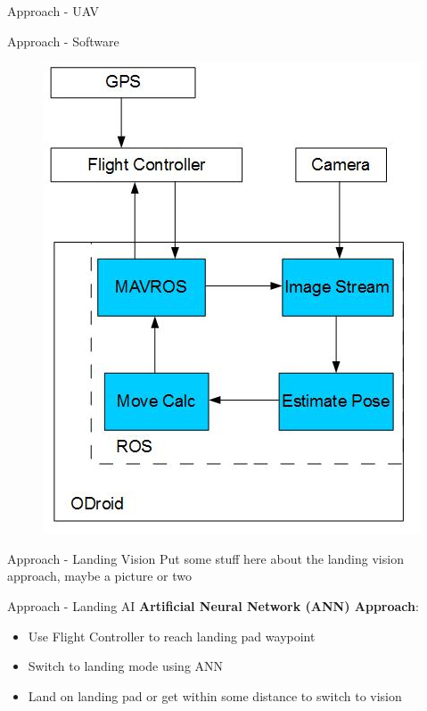 \documentclass[11pt]{beamer}
\begin{document}
\begin{frame}{Approach - UAV}

\end{frame}

\begin{frame}{Approach - Software}
\begin{figure}
\includegraphics[width=.5\textwidth]{broad_approach1}
\end{figure}
\end{frame}

\begin{frame}{Approach - Landing Vision}
Put some stuff here about the landing vision approach, maybe a picture or two
\end{frame}

\begin{frame}{Approach - Landing AI}
\textbf{Artificial Neural Network (ANN) Approach}:
\begin{itemize}
\item Use Flight Controller to reach landing pad waypoint
\item Switch to landing mode using ANN
\item Land on landing pad or get within some distance to switch to vision
\end{itemize}
\end{frame}
\end{document}
